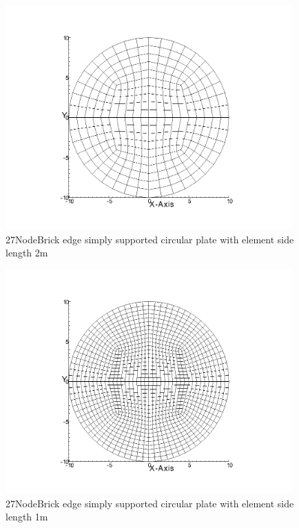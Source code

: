 \documentclass[fleqn,11pt,letter]{article}
\begin{document}
\begin{figure}[H]
  \centering
  \includegraphics[width=11cm]{../Figure_files/27NodeBrick/circular_plate3.png}
  \caption{27NodeBrick edge simply supported circular plate with element side length 2m }
  \label{fig 27NodeBrick edges simply supported circular plate with element side length 2m }
\end{figure}

\newpage

\begin{figure}[H]
  \centering
  \includegraphics[width=11cm]{../Figure_files/27NodeBrick/circular_plate4.png}
  \caption{27NodeBrick edge simply supported circular plate with element side length 1m }
  \label{fig 27NodeBrick edges simply supported circular plate with element side length 1m }
\end{figure}
\end{document}
